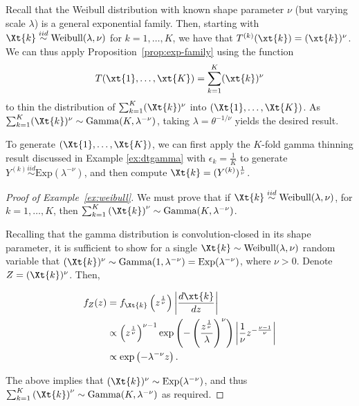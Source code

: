 \documentclass[12pt]{article}
\begin{document}
\begin{exmp}[Thinning $\text{Gamma}(\alpha,\theta)$ with $\alpha=K$ known, approach 3]
\label{ex:weibull}
Recall that the Weibull distribution with known shape parameter $\nu$ (but varying scale $\lambda$) is a general exponential family.  Then, starting with $\Xt{k} \overset{iid}{\sim} \text{Weibull}(\lambda, \nu)$ for $k=1,\dots,K$, we have that $T^{(k)}(\xt{k}) = (\xt{k})^\nu$. We can thus apply Proposition~\ref{prop:exp-family} using the function
$$
T(\xt{1},\dots,\xt{K})=\sum_{k=1}^K(\xt{k})^\nu
$$
to thin the distribution of $\sum_{k=1}^K(\Xt{k})^\nu$ into $(\Xt{1},\dots,\Xt{K})$. 
As $\sum_{k=1}^K(\Xt{k})^\nu\sim\text{Gamma}(K,\lambda^{-\nu})$, 
taking $\lambda=\theta^{-1/\nu}$ yields the desired result.  

To generate $(\Xt{1},\dots,\Xt{K})$, we can first apply the $K$-fold gamma thinning result discussed in Example \ref{ex:dtgamma} with $\epsilon_k = \frac{1}{K}$ to generate $Y^{(k)} \overset{iid}{\sim} \text{Exp}(\lambda^{-\nu})$, and then compute $\Xt{k} = (Y^{(k)})^{\frac{1}{\nu}}$. 
\end{exmp}

\begin{proof}[Proof of Example~\ref{ex:weibull}]
We must prove that if $\Xt{k} \overset{iid}{\sim} \text{Weibull}(\lambda, \nu)$, for $k=1,\dots,K$, then $\sum_{k=1}^K\left(\Xt{k}\right)^\nu\sim \text{Gamma}(K, \lambda^{-\nu})$.

Recalling that the gamma distribution is convolution-closed in its shape parameter, it is sufficient to show for a single $\Xt{k}\sim\text{Weibull}(\lambda, \nu)$ random variable that $(\Xt{k})^\nu \sim \text{Gamma}(1,\lambda^{-\nu})=\text{Exp}(\lambda^{-\nu})$, where $\nu>0$. Denote $Z=(\Xt{k})^\nu$. Then,

\begin{align*}
    f_Z(z) &= f_{\Xt{k}}\left(z^{\frac{1}{\nu}}\right)\left|\frac{d \xt{k}}{d z}\right| \\
    &\propto \left(z^{\frac{1}{\nu}}\right)^{\nu-1} \exp\left(-\left(\frac{z^{\frac{1}{\nu}}}{\lambda}\right)^\nu\right)\left|\frac{1}{\nu}z^{-\frac{\nu-1}{\nu}}\right| \\
    &\propto \exp\left(-\lambda^{-\nu}z\right).
\end{align*}

The above implies that $(\Xt{k})^\nu \sim \text{Exp}(\lambda^{-\nu})$, and thus $\sum_{k=1}^K\left(\Xt{k}\right)^\nu\sim \text{Gamma}(K, \lambda^{-\nu})$ as required.
    
\end{proof}
\end{document}
